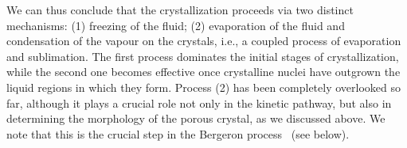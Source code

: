 \documentclass[preprint,amsmath,amssymb,superscriptaddress]{revtex4}
\begin{document}
We can thus conclude that the crystallization proceeds via two distinct mechanisms:
(1) freezing of the fluid; (2) evaporation of the fluid and condensation of the vapour on the crystals, i.e., a coupled process of evaporation and sublimation.
The first process dominates the initial stages of crystallization, while the second one becomes effective once
crystalline nuclei have outgrown the liquid regions in which they form. Process (2) has been completely overlooked so far, although it plays a crucial role 
not only in the kinetic pathway, but also in determining the morphology of the porous crystal, as we discussed above. We note that this is the crucial step  
in the Bergeron process~\cite{glickman2000glossary,morrison2012resilience} (see below).
% 
\end{document}
